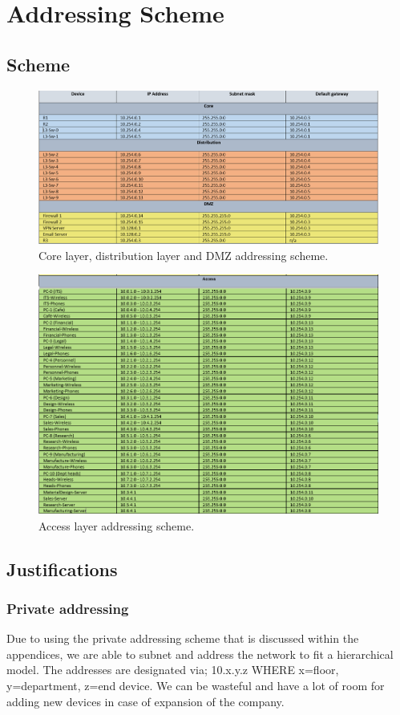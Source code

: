 \chapter{Addressing Scheme}
\section{Scheme}
\begin{figure}[H]
    \centering
    \includegraphics[width=15cm]{Figures/scheme_1.png}
    \caption{Core layer, distribution layer and DMZ addressing scheme.}
\end{figure}
\begin{figure}[H]
    \centering
    \includegraphics[width=15cm]{Figures/scheme_2.png}
    \caption{Access layer addressing scheme.}
\end{figure}
\section{Justifications}
\subsection{Private addressing}
Due to using the private addressing scheme that is discussed within the appendices, we are able to subnet and address the network to fit a hierarchical model. The addresses are designated via; 10.x.y.z WHERE x=floor, y=department, z=end device. We can be wasteful and have a lot of room for adding new devices in case of expansion of the company.
